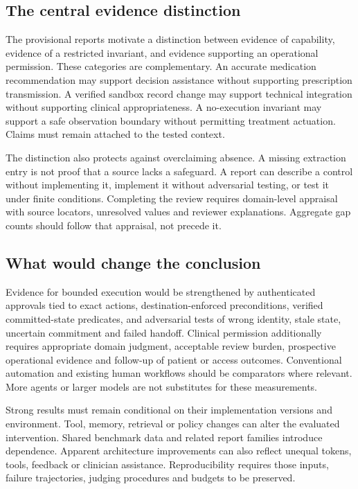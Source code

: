 \documentclass[journal,10pt]{IEEEtran}
\begin{document}
\subsection{The central evidence distinction}
The provisional reports motivate a distinction between evidence of capability, evidence of a restricted invariant, and evidence supporting an operational permission. These categories are complementary. An accurate medication recommendation may support decision assistance without supporting prescription transmission. A verified sandbox record change may support technical integration without supporting clinical appropriateness. A no-execution invariant may support a safe observation boundary without permitting treatment actuation. Claims must remain attached to the tested context.

The distinction also protects against overclaiming absence. A missing extraction entry is not proof that a source lacks a safeguard. A report can describe a control without implementing it, implement it without adversarial testing, or test it under finite conditions. Completing the review requires domain-level appraisal with source locators, unresolved values and reviewer explanations. Aggregate gap counts should follow that appraisal, not precede it.

\subsection{What would change the conclusion}
Evidence for bounded execution would be strengthened by authenticated approvals tied to exact actions, destination-enforced preconditions, verified committed-state predicates, and adversarial tests of wrong identity, stale state, uncertain commitment and failed handoff. Clinical permission additionally requires appropriate domain judgment, acceptable review burden, prospective operational evidence and follow-up of patient or access outcomes. Conventional automation and existing human workflows should be comparators where relevant. More agents or larger models are not substitutes for these measurements.

Strong results must remain conditional on their implementation versions and environment. Tool, memory, retrieval or policy changes can alter the evaluated intervention. Shared benchmark data and related report families introduce dependence. Apparent architecture improvements can also reflect unequal tokens, tools, feedback or clinician assistance. Reproducibility requires those inputs, failure trajectories, judging procedures and budgets to be preserved.
\end{document}
